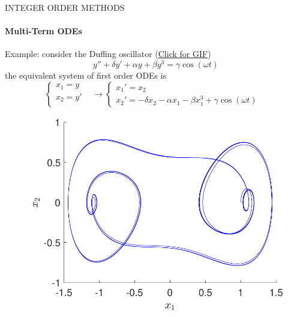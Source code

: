 \begin{frame}{INTEGER ORDER METHODS}
    \framesubtitle{Multi-Term ODEs}
    Example: consider the Duffing oscillator (\href{run:Spring_pendulum.gif}{Click for GIF})
    \begin{equation}
        y''+\delta y'+\alpha y+\beta y^{3}=\gamma \cos (\omega t)
    \end{equation}
    the equivalent system of first order ODEs is
    \begin{equation}
        \begin{cases}
        x_1 = y&\\
        x_2 = y'&\\
    \end{cases}\longrightarrow
    \begin{cases}
        x_1'=x_2&\\
        x_2'=-\delta x_2-\alpha x_1-\beta x_1^3 + \gamma\cos(\omega t)
    \end{cases}
    \end{equation}
    \begin{multicols}{2}
        \begin{figure}[H]
            \centering
            \includegraphics[scale=0.34]{files/Phase.pdf}
        \end{figure}
        \columnbreak
        \begin{figure}[H]
            \centering

\end{figure}
\end{multicols}
\end{frame}
